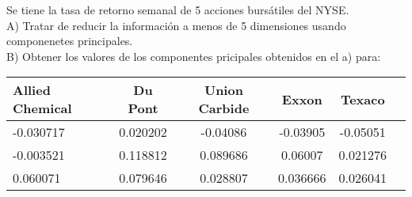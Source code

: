 \documentclass[12pt]{article}
\newenvironment{problem}[2][Problema]{\begin{trivlist}
\item[\hskip \labelsep {\bfseries #1}\hskip \labelsep {\bfseries #2.}]}{\end{trivlist}}
\begin{document}

\begin{problem}{1}
Se tiene la tasa de retorno semanal de 5 acciones bursátiles del NYSE.\\
A) Tratar de reducir la información a menos de 5 dimensiones usando componenetes principales.\\
B) Obtener los valores de los componentes pricipales obtenidos en el a) para:
\begin{table}[h]
    \centering
    \begin{tabular}{lccccc}
        \toprule
         Allied Chemical & Du Pont & Union Carbide & Exxon & Texaco \\
        \midrule
        -0.030717 & 0.020202 & -0.04086 & -0.03905 & -0.05051 \\
        -0.003521 & 0.118812 & 0.089686 & 0.06007 & 0.021276 \\
        0.060071  & 0.079646 & 0.028807 & 0.036666 & 0.026041 \\
        \bottomrule
    \end{tabular}
    \label{tab:datos}
\end{table}
\end{problem}
\end{document}
